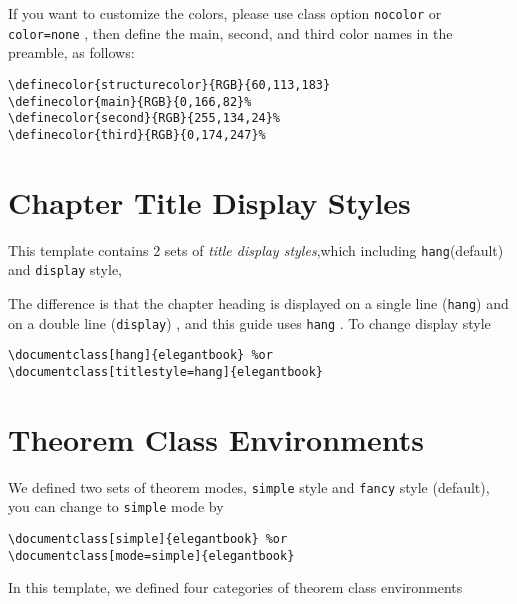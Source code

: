 \documentclass[noanswer,fancy,blue,11pt,hide]{elegantbook}
\begin{document}
If you want to customize the colors, please use class option \lstinline{nocolor} or \lstinline{color=none} , then define the main, second, and third color names in the preamble, as follows:
\begin{lstlisting}[frame=single]
\definecolor{structurecolor}{RGB}{60,113,183}
\definecolor{main}{RGB}{0,166,82}%
\definecolor{second}{RGB}{255,134,24}%
\definecolor{third}{RGB}{0,174,247}% 
\end{lstlisting}


\section{Chapter Title Display Styles}

This template contains 2 sets of \textit{title display styles},which including \lstinline{hang}(default) and \lstinline{display} style, 

The difference is that the chapter heading is displayed on a single line (\lstinline{hang}) and on a double line (\lstinline{display}) , and this guide uses \lstinline{hang} . To change display style
\begin{lstlisting}
\documentclass[hang]{elegantbook} %or
\documentclass[titlestyle=hang]{elegantbook}
\end{lstlisting}

\section{Theorem Class Environments}
We defined two sets of theorem modes, \lstinline{simple} style and \lstinline{fancy} style (default), you can change to \lstinline{simple} mode by 
\begin{lstlisting}
\documentclass[simple]{elegantbook} %or
\documentclass[mode=simple]{elegantbook}
\end{lstlisting}

In this template, we defined four categories of theorem class environments
\end{document}
